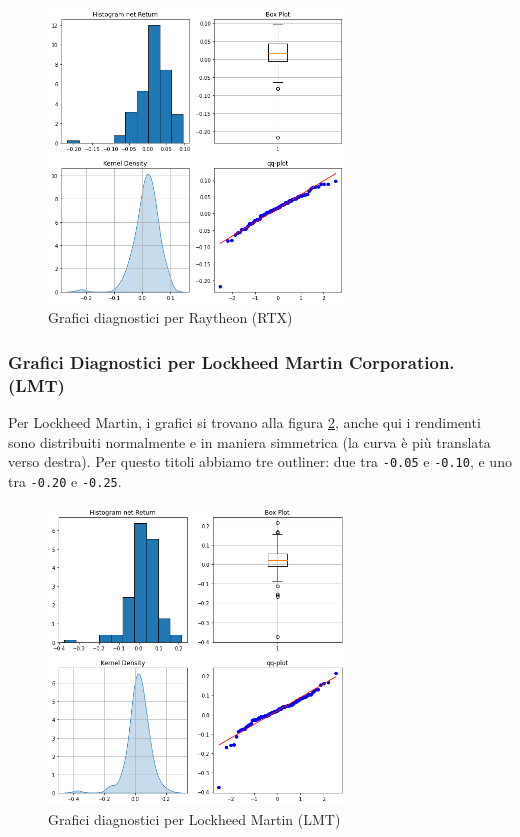 \documentclass{article}
\begin{document}
\begin{figure}[h]
  \centering
  \includegraphics[width=0.7\textwidth]{rtx_diagn.png}
  \caption{Grafici diagnostici per Raytheon (RTX)}
  \label{fig:rtx_diagn}
\end{figure}

\pagebreak

\subsubsection{Grafici Diagnostici per Lockheed Martin Corporation. (LMT)}

Per Lockheed Martin, i grafici si trovano alla figura \ref{fig:lmt_diagn}, anche qui i rendimenti sono distribuiti normalmente e in maniera simmetrica (la curva è più translata verso destra).
Per questo titoli abbiamo tre outliner: due tra \verb|-0.05| e \verb|-0.10|, e uno tra \verb|-0.20| e \verb|-0.25|.

\vspace{3cm}

\begin{figure}[h]
  \centering
  \includegraphics[width=0.7\textwidth]{lmt_diagn.png}
  \caption{Grafici diagnostici per Lockheed Martin (LMT)}
  \label{fig:lmt_diagn}
\end{figure}
\end{document}
